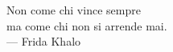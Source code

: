 
\cleardoublepage
{}
\thispagestyle{empty}

\vspace*{3cm}

\begin{center}
Non come chi vince sempre\\ma come chi non si arrende mai. \\ \medskip
--- Frida Khalo    
\end{center}

\medskip

